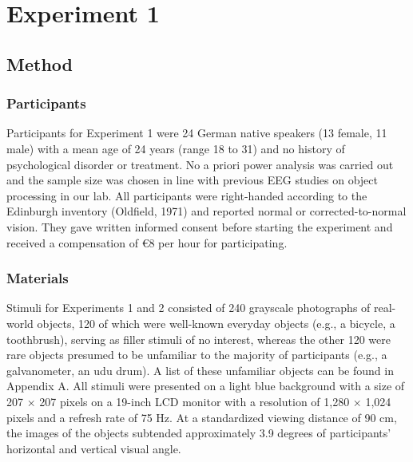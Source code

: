\documentclass[
  english,
  man,floatsintext]{apa7}
\begin{document}
\hypertarget{experiment-1}{%
\section{Experiment 1}\label{experiment-1}}

\hypertarget{method}{%
\subsection{Method}\label{method}}

\hypertarget{participants}{%
\subsubsection{Participants}\label{participants}}

Participants for Experiment 1 were 24 German native speakers (13 female, 11 male) with a mean age of 24 years (range 18 to 31) and no history of psychological disorder or treatment. No a priori power analysis was carried out and the sample size was chosen in line with previous EEG studies on object processing in our lab. All participants were right-handed according to the Edinburgh inventory (Oldfield, 1971) and reported normal or corrected-to-normal vision. They gave written informed consent before starting the experiment and received a compensation of €8 per hour for participating.

\hypertarget{materials}{%
\subsubsection{Materials}\label{materials}}

Stimuli for Experiments 1 and 2 consisted of 240 grayscale photographs of real-world objects, 120 of which were well-known everyday objects (e.g., a bicycle, a toothbrush), serving as filler stimuli of no interest, whereas the other 120 were rare objects presumed to be unfamiliar to the majority of participants (e.g., a galvanometer, an udu drum). A list of these unfamiliar objects can be found in Appendix A. All stimuli were presented on a light blue background with a size of 207 × 207 pixels on a 19-inch LCD monitor with a resolution of 1,280 × 1,024 pixels and a refresh rate of 75 Hz. At a standardized viewing distance of 90 cm, the images of the objects subtended approximately 3.9 degrees of participants' horizontal and vertical visual angle.
\end{document}
